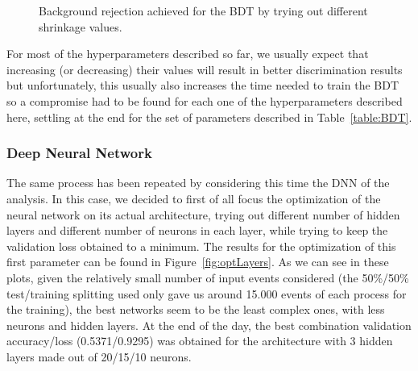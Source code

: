 \documentclass[a4paper, 10pt, openright]{report}
\begin{document}
\begin{appendices}
\begin{figure}[htbp]
{\begin{minipage}[b]{.48\textwidth}
\end{minipage}\hfill
}
\caption{Background rejection achieved for the \ac{BDT} by trying out different shrinkage values.}
\label{fig:optShrinkage}
\end{figure}

For most of the hyperparameters described so far, we usually expect that increasing (or decreasing) their values will result in better discrimination results but unfortunately, this usually also increases the time needed to train the \ac{BDT} so a compromise had to be found for each one of the hyperparameters described here, settling at the end for the set of parameters described in Table~\ref{table:BDT}.

\subsubsection{Deep Neural Network}

The same process has been repeated by considering this time the \ac{DNN} of the analysis. In this case, we decided to first of all focus the optimization of the neural network on its actual architecture, trying out different number of hidden layers and different number of neurons in each layer, while trying to keep the validation loss obtained to a minimum. The results for the optimization of this first parameter can be found in Figure~\ref{fig:optLayers}. As we can see in these plots, given the relatively small number of input events considered (the 50\%/50\% test/training splitting used only gave us around 15.000 events of each process for the training), the best networks seem to be the least complex ones, with less neurons and hidden layers. At the end of the day, the best combination validation accuracy/loss (0.5371/0.9295) was obtained for the architecture with 3 hidden layers made out of 20/15/10 neurons.


\end{appendices}
\end{document}
